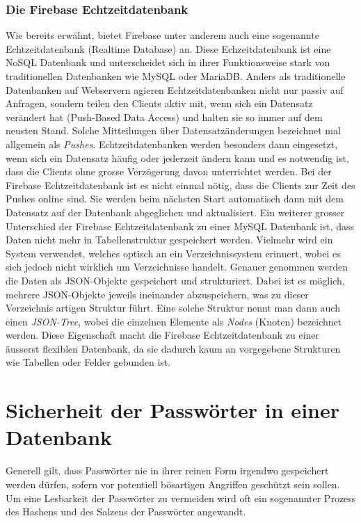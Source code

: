 \documentclass[../main.tex]{subfiles}
\begin{document}
	\subsubsection{Die Firebase Echtzeitdatenbank} \label{firebaseRealtime}
	Wie bereits erwähnt, bietet Firebase unter anderem auch eine sogenannte Echtzeitdatenbank (Realtime Database) an. Diese Echzeitdatenbank ist eine NoSQL Datenbank und unterscheidet sich in ihrer Funktionsweise stark von traditionellen Datenbanken wie MySQL oder MariaDB. Anders als traditionelle Datenbanken auf Webservern agieren Echtzeitdatenbanken nicht nur passiv auf Anfragen, sondern teilen den Clients aktiv mit, wenn sich ein Datensatz verändert hat (Push-Based Data Access) und halten sie so immer auf dem neusten Stand. Solche Mitteilungen über Datensatzänderungen bezeichnet mal allgemein als \emph{Pushes}. Echtzeitdatenbanken werden besonders dann eingesetzt, wenn sich ein Datensatz häufig oder jederzeit ändern kann und es notwendig ist, dass die Clients ohne grosse Verzögerung davon unterrichtet werden.\cite{RealtimeDatabase} Bei der Firebase Echtzeitdatenbank ist es nicht einmal nötig, dass die Clients zur Zeit des Pushes online sind. Sie werden beim nächsten Start automatisch dann mit dem Datensatz auf der Datenbank abgeglichen und aktualisiert. Ein weiterer grosser Unterschied der Firebase Echtzeitdatenbank zu einer MySQL Datenbank ist, dass Daten nicht mehr in Tabellenstruktur gespeichert werden. Vielmehr wird ein System verwendet, welches optisch an ein Verzeichnissystem erinnert, wobei es sich jedoch nicht wirklich um Verzeichnisse handelt. Genauer genommen werden die Daten als JSON-Objekte gespeichert und strukturiert. Dabei ist es möglich, mehrere JSON-Objekte jeweils ineinander abzuspeichern, was zu dieser Verzeichnis artigen Struktur führt. Eine solche Struktur nennt man dann auch einen \emph{JSON-Tree}, wobei die einzelnen Elemente als \emph{Nodes} (Knoten) bezeichnet werden. Diese Eigenschaft macht die Firebase Echtzeitdatenbank zu einer äusserst flexiblen Datenbank, da sie dadurch kaum an vorgegebene Strukturen wie Tabellen oder Felder gebunden ist. \cite{firebaseStructure}\cite{FirebaseRTDB}
	
	
	\section{Sicherheit der Passwörter in einer Datenbank}
	Generell gilt, dass Passwörter nie in ihrer reinen Form irgendwo gespeichert werden dürfen, sofern vor potentiell bösartigen Angriffen geschützt sein sollen. Um eine Lesbarkeit der Passwörter zu vermeiden wird oft ein sogenannter Prozess des Hashens und des Salzens der Passwörter angewandt. 
	
\end{document}
